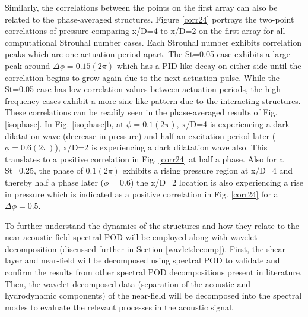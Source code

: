\documentclass[english]{aiaa-tc}
\begin{document}
Similarly, the correlations between the points on the first array can also be related to the phase-averaged structures. Figure \ref{corr24} portrays the two-point correlations of pressure comparing x/D=4 to x/D=2 on the first array for all computational Strouhal number cases. Each Strouhal number exhibits correlation peaks which are one actuation period apart. The St=0.05 case exhibits a large peak around $\Delta \phi=0.15(2\pi)$ which has a PID like decay on either side until the correlation begins to grow again due to the next actuation pulse. While the St=0.05 case has low correlation values between actuation periods, the high frequency cases exhibit a more sine-like pattern due to the interacting structures.  These correlations can be readily seen in the phase-averaged results of Fig. \ref{isophase}. In Fig. \ref{isophase}b, at $\phi=0.1(2\pi)$, x/D=4 is experiencing a dark dilatation wave (decrease in pressure) and half an excitation period later ($\phi=0.6(2\pi)$), x/D=2 is experiencing a dark dilatation wave also. This translates to a positive correlation in Fig. \ref{corr24} at half a phase. Also for a St=0.25, the phase of $0.1(2\pi)$ exhibits a rising pressure region at x/D=4 and thereby half a phase later ($\phi=0.6$) the x/D=2 location is also experiencing a rise in pressure which is indicated as a positive correlation in Fig. \ref{corr24} for a $\Delta \phi=0.5$.

To further understand the dynamics of the structures and how they relate to the near-acoustic-field spectral POD will be employed along with wavelet decomposition (discussed further in Section \ref{wavletdecomp}). First, the shear layer and near-field will be decomposed using spectral POD to validate and confirm the results from other spectral POD decompositions present in literature.\cite{jordan2007,Arndt1997,freund2002} Then, the wavelet decomposed data (separation of the acoustic and hydrodynamic components) of the near-field will be decomposed into the spectral modes to evaluate the relevant processes in the acoustic signal.
\end{document}
